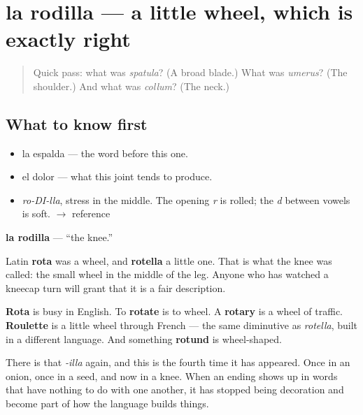 \section[la rodilla]{la rodilla — a little wheel, which is exactly right}

\label{lesson:ES-C293-rodilla}



\begin{quote}
Quick pass: what was \emph{spatula}? (A broad blade.) What was \emph{umerus}? (The shoulder.) And what was \emph{collum}? (The neck.)
\end{quote}

\subsection*{What to know first}
\begin{itemize}
\raggedright
  \item la espalda — the word before this one.
  \item el dolor — what this joint tends to produce.
\end{itemize}

\begin{sounds}
\begin{itemize}
\raggedright
  \item \emph{ro-DI-lla}, stress in the middle. The opening \emph{r} is rolled; the \emph{d} between vowels is soft. $\to$ reference
\end{itemize}
\end{sounds}

\begin{cousinweb}
\textbf{la rodilla} — \textquotedblleft{}the knee.\textquotedblright{}

Latin \textbf{rota} was a wheel, and \textbf{rotella} a little one. That is what the knee was called: the small wheel in the middle of the leg. Anyone who has watched a kneecap turn will grant that it is a fair description.

\textbf{Rota} is busy in English. To \textbf{rotate} is to wheel. A \textbf{rotary} is a wheel of traffic. \textbf{Roulette} is a little wheel through French — the same diminutive as \emph{rotella}, built in a different language. And something \textbf{rotund} is wheel-shaped.

There is that \emph{-illa} again, and this is the fourth time it has appeared. Once in an onion, once in a seed, and now in a knee. When an ending shows up in words that have nothing to do with one another, it has stopped being decoration and become part of how the language builds things.
\end{cousinweb}

